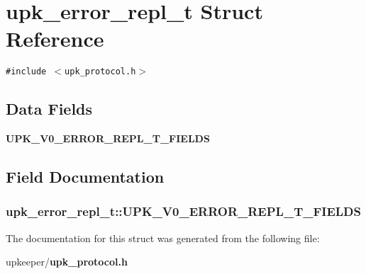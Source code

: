 \section{upk\_\-error\_\-repl\_\-t Struct Reference}
\label{structupk__error__repl__t}
{\tt \#include $<$upk\_\-protocol.h$>$}

\subsection*{Data Fields}
\begin{CompactItemize}
\item 
\bf{UPK\_\-V0\_\-ERROR\_\-REPL\_\-T\_\-FIELDS}
\end{CompactItemize}


\subsection{Field Documentation}
\subsubsection{\setlength{\rightskip}{0pt plus 5cm}\bf{upk\_\-error\_\-repl\_\-t::UPK\_\-V0\_\-ERROR\_\-REPL\_\-T\_\-FIELDS}}\label{structupk__error__repl__t_a259d86316bf74d8b721259acc7141c6}




The documentation for this struct was generated from the following file:\begin{CompactItemize}
\item 
upkeeper/\bf{upk\_\-protocol.h}\end{CompactItemize}
